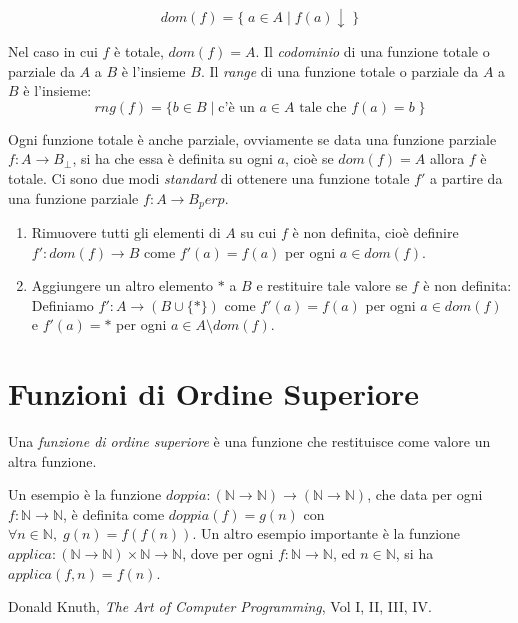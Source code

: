 \[ dom(f) = \{\; a \in A \;|\; f(a)\downarrow\; \} \]

Nel caso in cui $f$ è totale, $dom(f) = A$.  Il \emph{codominio} di
una funzione totale o parziale da $A$ a $B$ è l'insieme $B$.  Il
\emph{range} di una funzione totale o parziale da $A$ a $B$ è
l'insieme:
\[ rng(f) = \{ b \in B \; | \; \text{c'è un } a \in A \text{ tale che } f(a) = b \;\} \]

Ogni funzione totale è anche parziale, ovviamente se data una funzione
parziale $f: A \rightarrow B_\perp$, si ha che essa è definita su ogni
$a$, cioè se $dom(f) = A$ allora $f$ è totale.  Ci sono due modi
\emph{standard} di ottenere una funzione totale $f'$ a partire da una
funzione parziale $f: A \rightarrow B_perp$.
\begin{enumerate}
\item Rimuovere tutti gli elementi di $A$ su cui $f$ è non definita,
  cioè definire $f': dom(f) \rightarrow B$ come $f'(a) = f(a)$ per
  ogni $a \in dom(f)$.
\item Aggiungere un altro elemento $*$ a $B$ e restituire tale valore
  se $f$ è non definita: Definiamo $f' : A \rightarrow (B \cup \{ *
  \})$ come $f'(a) = f(a)$ per ogni $a \in dom(f)$ e $f'(a) = *$ per
  ogni $a \in A \setminus dom(f)$.
\end{enumerate}

\section{Funzioni di Ordine Superiore}

Una \emph{funzione di ordine superiore} è una funzione che restituisce
come valore un altra funzione.

Un esempio è la funzione $doppia:(\mathbb{N} \rightarrow \mathbb{N}) \rightarrow
(\mathbb{N} \rightarrow \mathbb{N})$, che data per ogni $f: \mathbb{N} \rightarrow \mathbb{N}$, è
definita come $doppia(f) = g(n)$ con $\forall n \in \mathbb{N}, \; g(n) =
f(f(n))$. Un altro esempio importante è la funzione $applica: (\mathbb{N}
\rightarrow \mathbb{N}) \times \mathbb{N} \rightarrow \mathbb{N}$, dove per ogni $f: \mathbb{N}
\rightarrow \mathbb{N}$, ed $n \in \mathbb{N}$, si ha $applica(f,n) = f(n)$.


\begin{thebibliography}{9}
 Donald Knuth, \emph{The Art of Computer Programming}, Vol I, II, III, IV.
\end{thebibliography}
